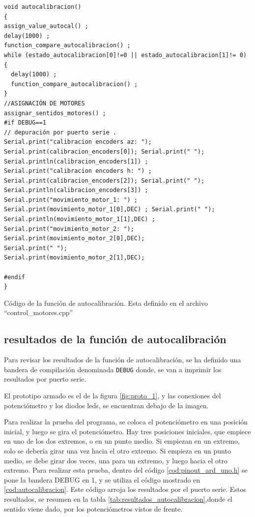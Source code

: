 \begin{listing}[ht]
	\begin{verbatim}
void autocalibracion()
{
assign_value_autocal() ;
delay(1000) ; 
function_compare_autocalibracion() ; 
while (estado_autocalibracion[0]!=0 || estado_autocalibracion[1]!= 0)
{
  delay(1000) ;     
  function_compare_autocalibracion() ;             
}
//ASIGNACIÓN DE MOTORES 
assignar_sentidos_motores() ; 
#if DEBUG==1
// depuración por puerto serie . 
Serial.print("calibracion encoders az: ");                   
Serial.print(calibracion_encoders[0]); Serial.print(" ");
Serial.println(calibracion_encoders[1]) ;
Serial.print("calibracion encoders h: ") ;
Serial.print(calibracion_encoders[2]); Serial.print(" ");
Serial.println(calibracion_encoders[3]) ;
Serial.print("movimiento_motor_1: ") ; 
Serial.print(movimiento_motor_1[0],DEC) ; Serial.print(" "); 
Serial.println(movimiento_motor_1[1],DEC) ;
Serial.print("movimiento_motor_2: ");
Serial.print(movimiento_motor_2[0],DEC); 
Serial.print(" ");
Serial.print(movimiento_motor_2[1],DEC); 			

#endif    	
}
\end{verbatim}
\caption{Código de la función de autocalibración. Esta definido en el archivo ``control\_motores.cpp''}
\label{cod:autocalibracion}

\end{listing}

\subsection{resultados de la función de autocalibración}

Para revisar los resultados de la función de autocalibración, se ha definido una bandera de compilación denominada \texttt{DEBUG} donde, se van a imprimir los resultados por puerto serie. 

El prototipo armado es el de la figura \ref{fig:proto_1}, y las conexiones del potenciómetro y los diodos leds, se encuentran debajo de la imagen.  
%

Para realizar la prueba del programa, se coloca el potenciómetro en una posición inicial, y luego se gira el potenciómetro. Hay tres posiciones iniciales, que empiece en uno de los dos extremos, o en un punto medio. Si empiezan en un extremo, solo se debería girar una vez hacia el otro extremo. Si empieza en un punto medio, se debe girar dos veces, una para un extremo, y luego hacia el otro extremo. Para realizar esta prueba, dentro del código \ref{cod:pinout_ard_uno.h} se pone la bandera DEBUG en 1, y se utiliza el código mostrado en \ref{cod:autocalibracion}. Este código arroja los resultados por el puerto serie. Estos resultados, se resumen en la tabla \ref{tab:resultados_autocalibracion},donde el sentido viene dado, por los potenciómetros vistos de frente.   

